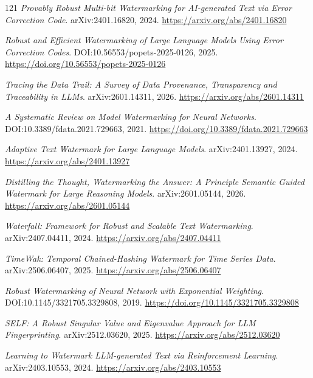\documentclass[11pt,a4paper]{article}
\begin{document}
\begin{thebibliography}{121}
\newblock \emph{Provably Robust Multi-bit Watermarking for AI-generated Text via Error Correction Code}.
\newblock arXiv:2401.16820, 2024.
\newblock \url{https://arxiv.org/abs/2401.16820}

\newblock \emph{Robust and Efficient Watermarking of Large Language Models Using Error Correction Codes}.
\newblock DOI:10.56553/popets-2025-0126, 2025.
\newblock \url{https://doi.org/10.56553/popets-2025-0126}

\newblock \emph{Tracing the Data Trail: A Survey of Data Provenance, Transparency and Traceability in LLMs}.
\newblock arXiv:2601.14311, 2026.
\newblock \url{https://arxiv.org/abs/2601.14311}

\newblock \emph{A Systematic Review on Model Watermarking for Neural Networks}.
\newblock DOI:10.3389/fdata.2021.729663, 2021.
\newblock \url{https://doi.org/10.3389/fdata.2021.729663}

\newblock \emph{Adaptive Text Watermark for Large Language Models}.
\newblock arXiv:2401.13927, 2024.
\newblock \url{https://arxiv.org/abs/2401.13927}

\newblock \emph{Distilling the Thought, Watermarking the Answer: A Principle Semantic Guided Watermark for Large Reasoning Models}.
\newblock arXiv:2601.05144, 2026.
\newblock \url{https://arxiv.org/abs/2601.05144}

\newblock \emph{Waterfall: Framework for Robust and Scalable Text Watermarking}.
\newblock arXiv:2407.04411, 2024.
\newblock \url{https://arxiv.org/abs/2407.04411}

\newblock \emph{TimeWak: Temporal Chained-Hashing Watermark for Time Series Data}.
\newblock arXiv:2506.06407, 2025.
\newblock \url{https://arxiv.org/abs/2506.06407}

\newblock \emph{Robust Watermarking of Neural Network with Exponential Weighting}.
\newblock DOI:10.1145/3321705.3329808, 2019.
\newblock \url{https://doi.org/10.1145/3321705.3329808}

\newblock \emph{SELF: A Robust Singular Value and Eigenvalue Approach for LLM Fingerprinting}.
\newblock arXiv:2512.03620, 2025.
\newblock \url{https://arxiv.org/abs/2512.03620}

\newblock \emph{Learning to Watermark LLM-generated Text via Reinforcement Learning}.
\newblock arXiv:2403.10553, 2024.
\newblock \url{https://arxiv.org/abs/2403.10553}


\end{thebibliography}
\end{document}
